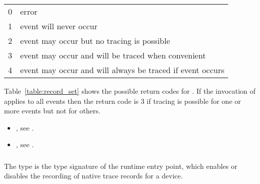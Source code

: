 \nolinenumbers
\renewcommand{\arraystretch}{1.5}
\tablelasttail{\hline}
\begin{supertabular}{p{2.0in} p{3.0in}}
0 & error\\
1 & event will never occur\\
2 & event may occur but no tracing is possible\\
3 & event may occur and will be traced when convenient\\
4 & event may occur and will always be traced if event occurs\\
\end{supertabular}

\linenumbers

\effect
Table~\ref{table:record_set} shows the possible return codes for 
. If the invocation of  
applies to all events then the return code is 3 if tracing is possible for 
one or more events but not for others.

\crossreferences
\begin{itemize}
\item {}, see .

\item {}, see .
\end{itemize}



\subsubsection{}
\label{sec:ompt_set_trace_native_t}

\summary
The  type is the type signature of the 
 runtime entry point, which enables or disables 
the recording of native trace records for a device.

